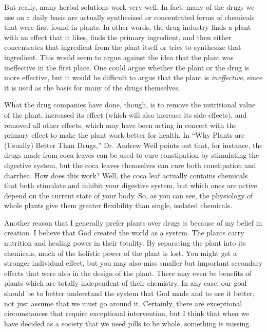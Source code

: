 But really, many herbal solutions work very well.  In fact, many of the
drugs we use on a daily basis are actually synthesized or concentrated
forms of chemicals that were first found in plants. In other words, the
drug industry finds a plant with an effect that it likes, finds the
primary ingredient, and then either concentrates that ingredient from
the plant itself or tries to synthesize that ingredient.  This would
seem to argue against the idea that the plant was ineffective in the
first place. One could argue whether the plant or the drug is more
effective, but it would be difficult to argue that the plant is
\textit{ineffective}, since it is used as the basis for many of the
drugs themselves.  

What the drug companies have done, though, is to
remove the nutritional value of the plant, increased its effect (which
will also increase its side effects), and removed all other effects,
which may have been acting in concert with the primary effect to make
the plant work better for health.  In ``Why Plants are (Usually) Better
Than Drugs,'' Dr. Andrew Weil points out that, for instance, the drugs
made from coca leaves can be used to cure constipation by stimulating
the digestive system, but the coca leaves themselves can cure both
constipation and diarrhea.  How does this work?  Well, the coca leaf
actually contains chemicals that both stimulate and inhibit your
digestive system, but which ones are active depend on the current state of your
body.  So, as you can see, the physiology of whole plants give them
greater flexibility than single, isolated chemicals. 

Another reason that I generally prefer plants over drugs is because of
my belief in creation. I believe that God created the world as a
system. The plants carry nutrition and healing power in their totality.
By separating the plant into its chemicals, much of the holistic power
of the plant is lost. You might get a stronger individual effect, but
you may also miss smaller but important secondary effects that were
also in the design of the plant. There may even be benefits of plants
which are totally independent of their chemistry.  In any case, our
goal should be to better understand the system that God made and to use it
better, not just assume that we must go around it. Certainly, there are
exceptional circumstances that require exceptional intervention, but I
think that when we have decided as a society that we need pills to be
whole, something is missing.

